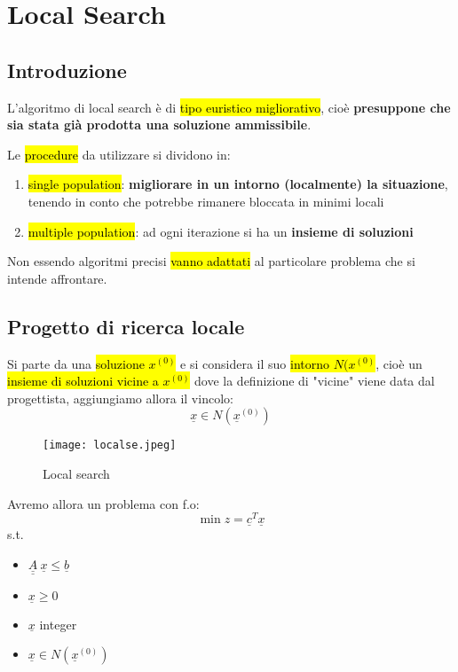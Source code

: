 \newpage
\section{Local Search}

\subsection{Introduzione}

L'algoritmo di local search è di \hl{tipo euristico migliorativo}, cioè \textbf{presuppone che sia stata già prodotta una soluzione ammissibile}. 

Le \hl{procedure} da utilizzare si dividono in:

\begin{enumerate}
    \item \hl{single population}: \textbf{migliorare in un intorno (localmente) la situazione}, tenendo in conto che potrebbe rimanere bloccata in minimi locali
    \item \hl{multiple population}: ad ogni iterazione si ha un \textbf{insieme di soluzioni}
\end{enumerate}

Non essendo algoritmi precisi \hl{vanno adattati} al particolare problema che si intende affrontare.


\subsection{Progetto di ricerca locale}

Si parte da una \hl{soluzione $x^{(0)}$} e si considera il suo \hl{intorno $N(x^{(0)}$}, cioè un \hl{insieme di soluzioni vicine a $x^{(0)}$} dove la definizione di "vicine" viene data dal progettista, aggiungiamo allora il vincolo:
$$\underline{x} \in N(\underline{x}^{(0)})$$


\begin{figure}[H]
\centering
\texttt{[image: localse.jpeg]}
\caption{Local search} 
\label{localse}
\end{figure}


Avremo allora un problema con f.o:
$$\min z = \underline{c}^T\underline{x}$$
s.t.

\begin{itemize}
    \item $\underline{\underline{A}}\ \underline{x} \leq \underline{b}$
    \item $\underline{x} \geq 0$
    \item $\underline{x}$ integer
    \item $\underline{x} \in N(\underline{x}^{(0)})$
\end{itemize}

